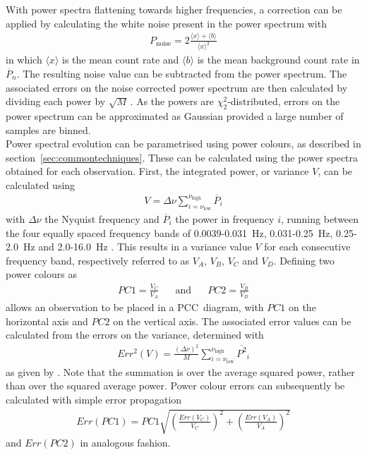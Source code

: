 \clearpage
With power spectra flattening towards higher frequencies, a correction can be applied by calculating the white noise present in the power spectrum with
\begin{align} 
P_\textrm{noise} = 2\frac{\langle x \rangle + \langle b \rangle}{\langle x \rangle ^2} \label{eq:noise}
\end{align}
in which $\langle x \rangle$ is the mean count rate and $\langle b \rangle$ is the mean background count rate in $\overline{P}_n$. The resulting noise value can be subtracted from the power spectrum. The associated errors on the noise corrected power spectrum are then calculated by dividing each power by $\sqrt{M}\hspace{2pt}$. As the powers are $\chi^2_2$-distributed, errors on the power spectrum can be approximated as Gaussian provided a large number of samples are binned.\\

Power spectral evolution can be parametrised using power colours, as described in section~\ref{sec:commontechniques}. These can be calculated using the power spectra obtained for each observation. First, the integrated power, or variance $V$, can be calculated using
\begin{align} 
V = \Delta \nu \sum_{i=\nu_\textrm{low}}^{\nu_\textrm{high}} \overline{P}_i
\end{align}
with $\Delta \nu$ the Nyquist frequency and $\overline{P}_i$ the power in frequency $i$, running between the four equally spaced frequency bands of 0.0039-0.031~Hz, 0.031-0.25~Hz, 0.25-2.0~Hz and 2.0-16.0~Hz \citep{heil2015power}. This results in a variance value $V$ for each consecutive frequency band, respectively referred to as $V_A$, $V_B$, $V_C$ and $V_D$. Defining two power colours as
\begin{align}
	PC1 = \frac{V_C}{V_A} \hspace{20pt} \textrm{and} \hspace{20pt} PC2 = \frac{V_B}{V_D} 
\end{align}
allows an observation to be placed in a \ac{PCC}~diagram, with $PC1$ on the horizontal axis and $PC2$ on the vertical axis. The associated error values can be calculated from the errors on the variance, determined with
\begin{align}
Err^2(V) = \frac{(\Delta \nu)^2}{M} \sum_{i=\nu_\textrm{low}}^{\nu_\textrm{high}} \overline{ P^2 }_i
\end{align}
as given by \citet{heil2012ubiquity}. Note that the summation is over the average squared power, rather than over the squared average power. Power colour errors can subsequently be calculated with simple error propagation
\begin{align}
Err(PC1) = PC1 \sqrt{\left(\frac{Err(V_C)}{V_C}\right) ^2 + \left(\frac{Err(V_A)}{V_A}\right) ^2}
\end{align}
and $Err(PC2)$ in analogous fashion.

